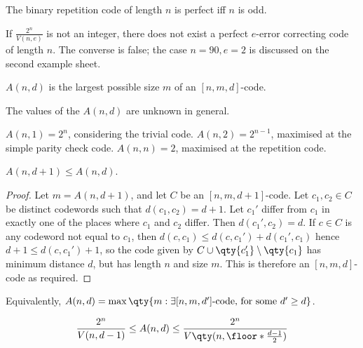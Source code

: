\begin{example}
    The binary repetition code of length $n$ is perfect iff $n$ is odd.
\end{example}

\begin{remark}
    If $\frac{2^n}{V(n,e)}$ is not an integer, there does not exist a perfect $e$-error correcting code of length $n$.
    The converse is false; the case $n = 90, e = 2$ is discussed on the second example sheet.
\end{remark}

\begin{definition}[$A(n,d)$]
    $A(n,d)$ is the largest possible size $m$ of an $[n,m,d]$-code.
\end{definition}

The values of the $A(n,d)$ are unknown in general.

\begin{example}
    $A(n,1) = 2^n$, considering the trivial code.
    $A(n,2) = 2^{n-1}$, maximised at the simple parity check code.
    $A(n,n) = 2$, maximised at the repetition code.
\end{example}

\begin{lemma}
    $A(n,d+1) \leq A(n,d)$.
\end{lemma}

\begin{proof}
    Let $m = A(n,d+1)$, and let $C$ be an $[n,m,d+1]$-code.
    Let $c_1, c_2 \in C$ be distinct codewords such that $d(c_1,c_2) = d+1$.
    Let $c_1'$ differ from $c_1$ in exactly one of the places where $c_1$ and $c_2$ differ.
    Then $d(c_1', c_2) = d$.
    If $c \in C$ is any codeword not equal to $c_1$, then $d(c,c_1) \leq d(c,c_1') + d(c_1',c_1)$ hence $d + 1 \leq d(c,c_1') + 1$, so the code given by $C \cup \qty{c_1'} \setminus \qty{c_1}$ has minimum distance $d$, but has length $n$ and size $m$.
    This is therefore an $[n,m,d]$-code as required.
\end{proof}

\begin{corollary}
    Equivalently, $A(n,d) = \max \qty{m : \exists [n,m,d'] \text{-code, for some } d' \geq d}$.
\end{corollary}

\begin{theorem}
    \begin{align*}
        \frac{2^n}{V(n,d-1)} \leq A(n,d) \leq \frac{2^n}{V\qty(n,\floor*{\frac{d-1}{2}})}
    \end{align*}
\end{theorem}

